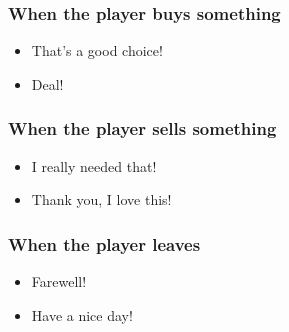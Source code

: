 \subsubsection*{When the player buys something}
\begin{itemize}
\item That's a good choice!

\item Deal!
\end{itemize}


\subsubsection*{When the player sells something}
\begin{itemize}
\item I really needed that!

\item Thank you, I love this!
\end{itemize}


\subsubsection*{When the player leaves}
\begin{itemize}
\item Farewell!

\item Have a nice day!
\end{itemize}
